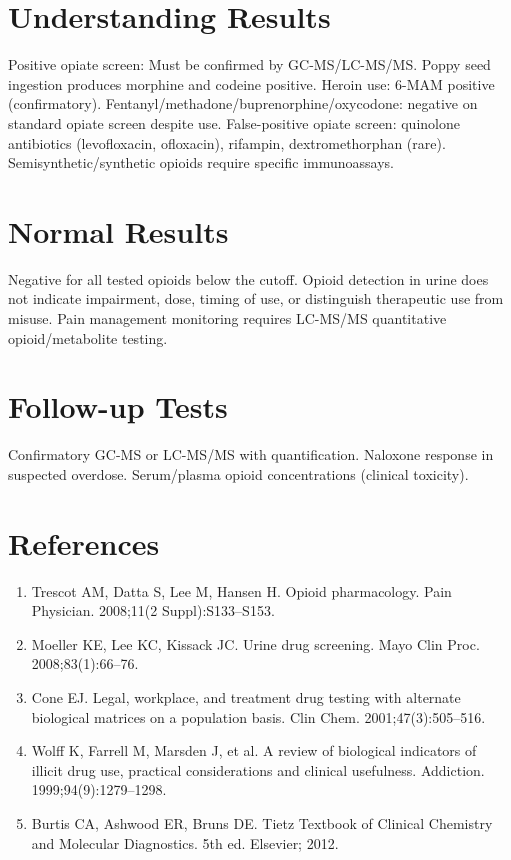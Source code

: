 \section*{Understanding Results}
Positive opiate screen: Must be confirmed by GC-MS/LC-MS/MS. Poppy seed ingestion produces morphine and codeine positive. Heroin use: 6-MAM positive (confirmatory). Fentanyl/methadone/buprenorphine/oxycodone: negative on standard opiate screen despite use. False-positive opiate screen: quinolone antibiotics (levofloxacin, ofloxacin), rifampin, dextromethorphan (rare). Semisynthetic/synthetic opioids require specific immunoassays.
\section*{Normal Results}
Negative for all tested opioids below the cutoff. Opioid detection in urine does not indicate impairment, dose, timing of use, or distinguish therapeutic use from misuse. Pain management monitoring requires LC-MS/MS quantitative opioid/metabolite testing.
\section*{Follow-up Tests}
Confirmatory GC-MS or LC-MS/MS with quantification. Naloxone response in suspected overdose. Serum/plasma opioid concentrations (clinical toxicity).
\section*{References}
\begin{enumerate}
  \item Trescot AM, Datta S, Lee M, Hansen H. Opioid pharmacology. Pain Physician. 2008;11(2 Suppl):S133--S153.
  \item Moeller KE, Lee KC, Kissack JC. Urine drug screening. Mayo Clin Proc. 2008;83(1):66--76.
  \item Cone EJ. Legal, workplace, and treatment drug testing with alternate biological matrices on a population basis. Clin Chem. 2001;47(3):505--516.
  \item Wolff K, Farrell M, Marsden J, et al. A review of biological indicators of illicit drug use, practical considerations and clinical usefulness. Addiction. 1999;94(9):1279--1298.
  \item Burtis CA, Ashwood ER, Bruns DE. Tietz Textbook of Clinical Chemistry and Molecular Diagnostics. 5th ed. Elsevier; 2012.
\end{enumerate}
\clearpage
